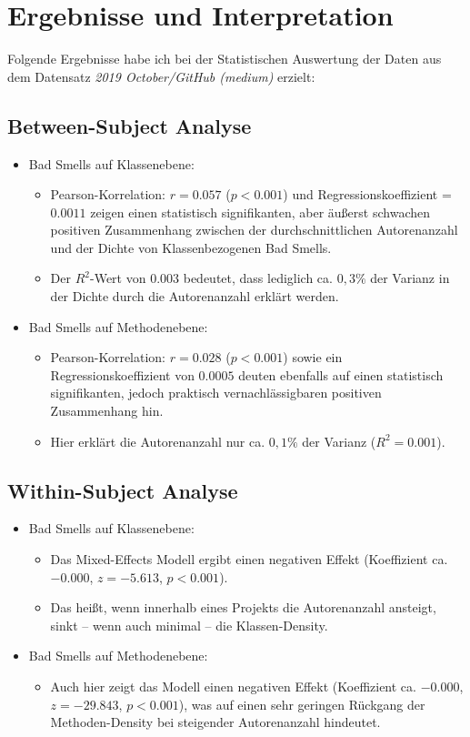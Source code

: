 \documentclass[12pt]{article}
\begin{document}
\section{Ergebnisse und Interpretation}
Folgende Ergebnisse habe ich bei der Statistischen Auswertung der Daten aus dem Datensatz \emph{2019 October/GitHub (medium)} erzielt:
\subsection{Between-Subject Analyse}
\begin{itemize}
	\item Bad Smells auf Klassenebene:
	\begin{itemize}
		\item Pearson-Korrelation: $r = 0.057$ ($p < 0.001$) und Regressionskoeffizient = $0.0011$ zeigen einen statistisch signifikanten, aber äußerst schwachen positiven Zusammenhang zwischen der durchschnittlichen Autorenanzahl und der Dichte von Klassenbezogenen Bad Smells.
		\item Der $R^2$-Wert von $0.003$ bedeutet, dass lediglich ca. $0,3\%$ der Varianz in der Dichte durch die Autorenanzahl erklärt werden.
	\end{itemize}
	
	\item Bad Smells auf Methodenebene:
	\begin{itemize}
		\item Pearson-Korrelation: $r = 0.028$ ($p < 0.001$) sowie ein Regressionskoeffizient von $0.0005$ deuten ebenfalls auf einen statistisch signifikanten, jedoch praktisch vernachlässigbaren positiven Zusammenhang hin.
		\item Hier erklärt die Autorenanzahl nur ca. $0,1\%$ der Varianz ($R^2 = 0.001$).
	\end{itemize}
\end{itemize}

\subsection{Within-Subject Analyse}
\begin{itemize}
	\item Bad Smells auf Klassenebene:
	\begin{itemize}
		\item Das Mixed-Effects Modell ergibt einen negativen Effekt (Koeffizient ca. $-0.000$, $z = -5.613$, $p < 0.001$).
		\item Das heißt, wenn innerhalb eines Projekts die Autorenanzahl ansteigt, sinkt – wenn auch minimal – die Klassen-Density.
	\end{itemize}
	\item Bad Smells auf Methodenebene:
	\begin{itemize}
		\item Auch hier zeigt das Modell einen negativen Effekt (Koeffizient ca. $-0.000$, $z = -29.843$, $p < 0.001$), was auf einen sehr geringen Rückgang der Methoden-Density bei steigender Autorenanzahl hindeutet.
	\end{itemize}
\end{itemize}
\end{document}
